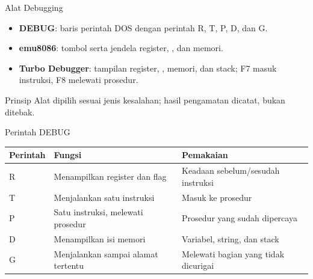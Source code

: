 \documentclass[aspectratio=169,11pt]{beamer}
\begin{document}
\begin{frame}{Alat Debugging}
\small
\begin{itemize}
    \item \textbf{DEBUG}:  baris perintah DOS dengan
          perintah R, T, P, D, dan G.

    \vspace{0.18em}
    \item \textbf{emu8086}: tombol  serta jendela
          register, , dan memori.

    \vspace{0.18em}
    \item \textbf{Turbo Debugger}: tampilan register, ,
          memori, dan stack; F7 masuk instruksi, F8 melewati
          prosedur.
\end{itemize}

\vspace{0.2em}
\begin{block}{Prinsip}
\small Alat dipilih sesuai jenis kesalahan; hasil pengamatan dicatat,
bukan ditebak.
\end{block}
\end{frame}

\begin{frame}{Perintah DEBUG}
\footnotesize
\begin{center}
\begin{tabular}{@{}>{\raggedright\arraybackslash}p{1.8cm}
    >{\raggedright\arraybackslash}p{5.6cm}
    >{\raggedright\arraybackslash}p{5.4cm}@{}}
    \toprule
    \textbf{Perintah} & \textbf{Fungsi} & \textbf{Pemakaian} \\
    \midrule
    R & Menampilkan register dan flag &
    Keadaan sebelum/sesudah instruksi \\
    \addlinespace
    T & Menjalankan satu instruksi & Masuk ke prosedur \\
    \addlinespace
    P & Satu instruksi, melewati prosedur &
    Prosedur yang sudah dipercaya \\
    \addlinespace
    D & Menampilkan isi memori &
    Variabel, string, dan stack \\
    \addlinespace
    G & Menjalankan sampai alamat tertentu &
    Melewati bagian yang tidak dicurigai \\
    \bottomrule
\end{tabular}
\end{center}
\end{frame}
\end{document}
